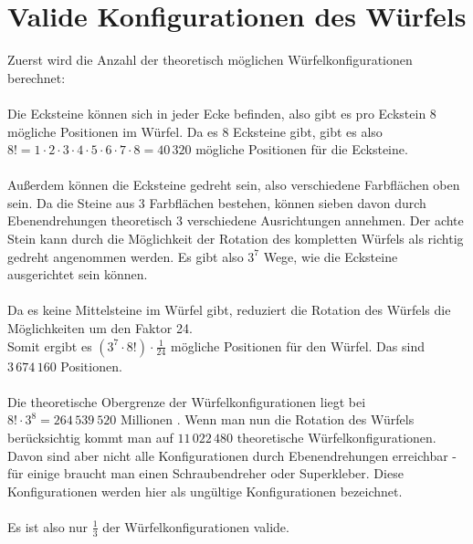 \documentclass[12pt,a4paper, usenames, dvipsnames]{article}
\begin{document}














\newpage

\section{Valide Konfigurationen des Würfels}

Zuerst wird die Anzahl der theoretisch möglichen Würfelkonfigurationen berechnet: \\ 
\\
Die Ecksteine können sich in jeder Ecke befinden, also gibt es pro Eckstein 8 mögliche Positionen im Würfel. Da es 8 Ecksteine gibt, gibt es also $8! = 1 \cdot 2 \cdot 3 \cdot 4 \cdot 5 \cdot 6 \cdot 7 \cdot 8 = 40\, 320$ mögliche Positionen für die Ecksteine. \\ 
\\
Außerdem können die Ecksteine gedreht sein, also verschiedene Farbflächen oben sein. Da die Steine aus 3 Farbflächen bestehen, können sieben davon durch Ebenendrehungen theoretisch 3 verschiedene Ausrichtungen annehmen. Der achte Stein kann durch die Möglichkeit der Rotation des kompletten Würfels als richtig gedreht angenommen werden. Es gibt also $3^7$ Wege, wie die Ecksteine ausgerichtet sein können. \\
\\
Da es keine Mittelsteine im Würfel gibt, reduziert die Rotation des Würfels die Möglichkeiten um den Faktor 24. \\
Somit ergibt es $(3^7 \cdot 8!) \cdot \frac{1}{24}$ mögliche Positionen für den Würfel. Das sind $3\, 674\, 160$ Positionen.\\
\\
Die theoretische Obergrenze der Würfelkonfigurationen liegt bei $8! \cdot 3^8 = 264 \, 539 \ 520$ Millionen \cite{MMFAA}. Wenn man nun die Rotation des Würfels berücksichtig kommt man auf $11 \, 022 \, 480$ theoretische Würfelkonfigurationen. \\
Davon sind aber nicht alle Konfigurationen durch Ebenendrehungen erreichbar - für einige braucht man einen Schraubendreher oder Superkleber. Diese Konfigurationen werden hier als ungültige Konfigurationen bezeichnet. \\
\\
Es ist also nur $\frac{1}{3}$ der Würfelkonfigurationen valide.
 
\end{document}
